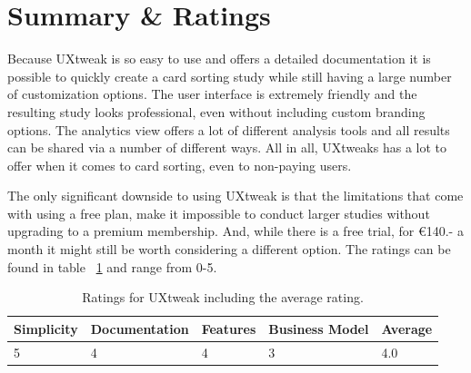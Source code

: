 \section{Summary \& Ratings}
Because UXtweak is so easy to use and offers a detailed documentation it is 
possible to quickly create a card sorting study while still having a large 
number of customization options. The user interface is extremely friendly 
and the resulting study looks professional, even without including custom 
branding options. The analytics view offers a lot of different analysis tools 
and all results can be shared via a number of different ways. All in all, 
UXtweaks has a lot to offer when it comes to card sorting, even to non-paying 
users.

The only significant downside to using UXtweak is that the limitations that come
with using a free plan, make it impossible to conduct larger studies without 
upgrading to a premium membership. And, while there is a free trial, for €140.-
a month it might still be worth considering a different option.  The ratings can 
be found in table ~\ref{tab:rating-UXtweak} and range from 0-5.


\begin{table}[tp] 
\centering 
\begin{tabularx}{\linewidth}{|X|X|X|X|X|}
\hline
Simplicity & Documentation & Features & Business Model & Average \\ 
\hline 
5 & 4 & 4 & 3 & 4.0 \\ 
\hline 
\end{tabularx} 
\caption[Ratings for UXtweak] {
Ratings for UXtweak including the average rating.
} 
\label{tab:rating-UXtweak}
\end{table}





